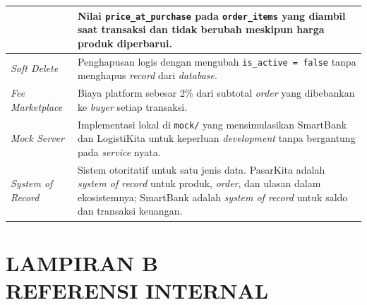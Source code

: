 \begin{longtable}{|L{4cm}|L{11cm}|}
        & Nilai \texttt{price\_at\_purchase} pada \texttt{order\_items} yang
          diambil saat transaksi dan tidak berubah meskipun harga produk
          diperbarui. \\
    \hline
    \textit{Soft Delete}
        & Penghapusan logis dengan mengubah \texttt{is\_active = false} tanpa
          menghapus \textit{record} dari \textit{database}. \\
    \hline
    \textit{Fee Marketplace}
        & Biaya platform sebesar 2\% dari subtotal \textit{order} yang dibebankan
          ke \textit{buyer} setiap transaksi. \\
    \hline
    \textit{Mock Server}
        & Implementasi lokal di \texttt{mock/} yang mensimulasikan SmartBank dan
          LogistiKita untuk keperluan \textit{development} tanpa bergantung pada
          \textit{service} nyata. \\
    \hline
    \textit{System of Record}
        & Sistem otoritatif untuk satu jenis data. PasarKita adalah
          \textit{system of record} untuk produk, \textit{order}, dan ulasan dalam
          ekosistemnya; SmartBank adalah \textit{system of record} untuk saldo dan
          transaksi keuangan. \\
    \hline
\end{longtable}

\clearpage

\section*{LAMPIRAN B \\ REFERENSI INTERNAL}
{}

